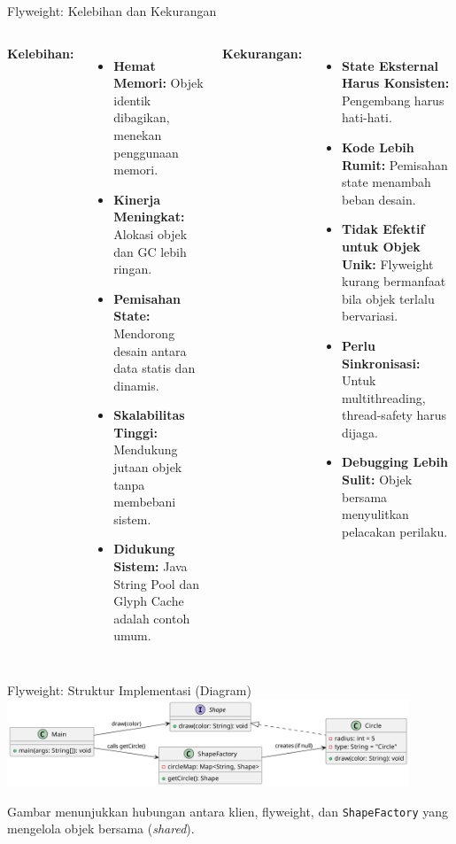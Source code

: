 \documentclass[aspectratio=169, table]{beamer}
\begin{document}
\begin{frame}{Flyweight: Kelebihan dan Kekurangan}
	\vspace{20pt}
	\begin{columns}[T]
		\textbf{Kelebihan:}
		\begin{itemize}
			\item \textbf{Hemat Memori:} Objek identik dibagikan, menekan penggunaan memori.
			\item \textbf{Kinerja Meningkat:} Alokasi objek dan GC lebih ringan.
			\item \textbf{Pemisahan State:} Mendorong desain antara data statis dan dinamis.
			\item \textbf{Skalabilitas Tinggi:} Mendukung jutaan objek tanpa membebani sistem.
			\item \textbf{Didukung Sistem:} Java String Pool dan Glyph Cache adalah contoh umum.
		\end{itemize}
		
		\textbf{Kekurangan:}
		\begin{itemize}
			\item \textbf{State Eksternal Harus Konsisten:} Pengembang harus hati-hati.
			\item \textbf{Kode Lebih Rumit:} Pemisahan state menambah beban desain.
			\item \textbf{Tidak Efektif untuk Objek Unik:} Flyweight kurang bermanfaat bila objek terlalu bervariasi.
			\item \textbf{Perlu Sinkronisasi:} Untuk multithreading, thread-safety harus dijaga.
			\item \textbf{Debugging Lebih Sulit:} Objek bersama menyulitkan pelacakan perilaku.
		\end{itemize}
	\end{columns}
\end{frame}


\begin{frame}[fragile]{Flyweight: Struktur Implementasi (Diagram)}
	\vspace{10pt}
	\centering
	\includegraphics[width=0.9\textwidth]{../../figures/out/flyweight.png}
	\vspace{10pt}
	
	\small Gambar menunjukkan hubungan antara klien, flyweight, dan \texttt{ShapeFactory} yang mengelola objek bersama (\textit{shared}).
\end{frame}
\end{document}

